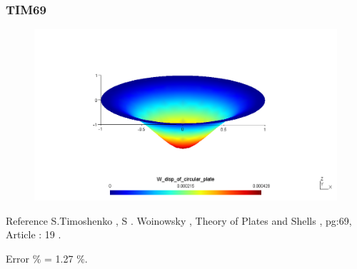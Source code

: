 \documentclass[9pt]{beamer}
\begin{document}
\begin{frame}
\frametitle{TIM69}


\begin{figure}[h!]
\centering
{}%
  \includegraphics[width=\linewidth,trim={5cm 4cm 5cm 4cm},clip]{TIM69_pos.png}
\endminipage
\end{figure}

\begin{block}{Reference}
S.Timoshenko , S . Woinowsky , Theory of Plates and Shells , pg:69, Article : 19 . 
\end{block}
Error $\%$ = 1.27 $\%$.



\end{frame}
\end{document}
